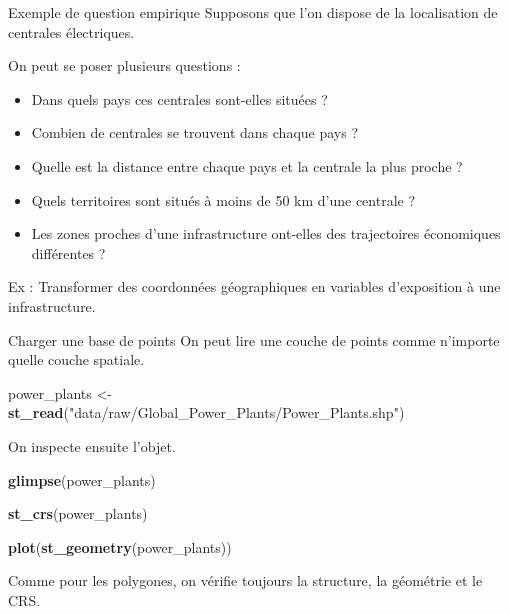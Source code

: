 \documentclass[
  10pt,
  ignorenonframetext,
]{beamer}
\newenvironment{Shaded}{\begin{snugshade}}{\end{snugshade}}
\newcommand{\FunctionTok}[1]{\textcolor[rgb]{0.13,0.29,0.53}{\textbf{#1}}}
\newcommand{\NormalTok}[1]{#1}
\newcommand{\OtherTok}[1]{\textcolor[rgb]{0.56,0.35,0.01}{#1}}
\newcommand{\StringTok}[1]{\textcolor[rgb]{0.31,0.60,0.02}{#1}}
\begin{document}
\begin{frame}{Exemple de question empirique}
\label{exemple-de-question-empirique}
Supposons que l'on dispose de la localisation de centrales électriques.

On peut se poser plusieurs questions :

\begin{itemize}
  \item Dans quels pays ces centrales sont-elles situées ?
  \item Combien de centrales se trouvent dans chaque pays ?
  \item Quelle est la distance entre chaque pays et la centrale la plus proche ?
  \item Quels territoires sont situés à moins de 50 km d’une centrale ?
  \item Les zones proches d’une infrastructure ont-elles des trajectoires économiques différentes ?
\end{itemize}

Ex : Transformer des coordonnées géographiques en variables d'exposition
à une infrastructure.
\end{frame}

\begin{frame}[fragile]{Charger une base de points}
\label{charger-une-base-de-points}
On peut lire une couche de points comme n'importe quelle couche
spatiale.

\begin{Shaded}
\begin{Highlighting}[]
\NormalTok{power\_plants }\OtherTok{\textless{}{-}} \FunctionTok{st\_read}\NormalTok{(}\StringTok{"data/raw/Global\_Power\_Plants/Power\_Plants.shp"}\NormalTok{)}
\end{Highlighting}
\end{Shaded}

On inspecte ensuite l'objet.

\begin{Shaded}
\begin{Highlighting}[]
\FunctionTok{glimpse}\NormalTok{(power\_plants)}

\FunctionTok{st\_crs}\NormalTok{(power\_plants)}

\FunctionTok{plot}\NormalTok{(}\FunctionTok{st\_geometry}\NormalTok{(power\_plants))}
\end{Highlighting}
\end{Shaded}

Comme pour les polygones, on vérifie toujours la structure, la géométrie
et le CRS.
\end{frame}
\end{document}
